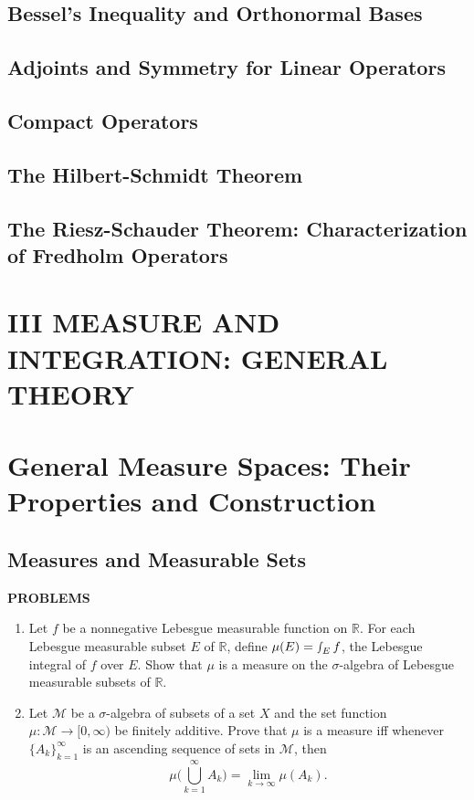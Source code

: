 \documentclass[a4paper,10pt]{book}
\theoremstyle{plain} %
\begin{document}
\section{Bessel's Inequality and Orthonormal Bases}
\section{Adjoints and Symmetry for Linear Operators}
\section{Compact Operators}
\section{The Hilbert-Schmidt Theorem}
\section{The Riesz-Schauder Theorem: Characterization of Fredholm Operators}

\setcounter{chapter}{0}
\chapter*{III MEASURE AND INTEGRATION: GENERAL THEORY} 
\setcounter{chapter}{16}

\chapter{General Measure Spaces: Their Properties and Construction}

\section{Measures and Measurable Sets}

\begin{center}
	\textbf{PROBLEMS}
\end{center}
\begin{enumerate}
	\setcounter{enumi}{0}
	\item Let $f$ be a nonnegative Lebesgue measurable function on $\mathbb{R}$. 
	For each Lebesgue measurable subset $E$ of $\mathbb{R}$, define $\mu(E) = \smallint_E f$, the Lebesgue integral of $f$ over $E$.
	Show that $\mu$ is a measure on the $\sigma$-algebra of Lebesgue measurable subsets of $\mathbb{R}$.
	\item Let $\mathcal{M}$ be a $\sigma$-algebra of subsets of a set $X$ and the set function $\mu : \mathcal{M} \to [0,\infty)$ be finitely additive.
	Prove that $\mu$ is a measure iff whenever $\{A_k\}_{k=1}^\infty$ is an ascending sequence of sets in $\mathcal{M}$, then
	\[
	\mu \biggl ( \bigcup_{k=1}^\infty A_k \biggr ) = \lim_{k \to \infty} \mu(A_k).	
	\]
\end{enumerate}
\end{document}
